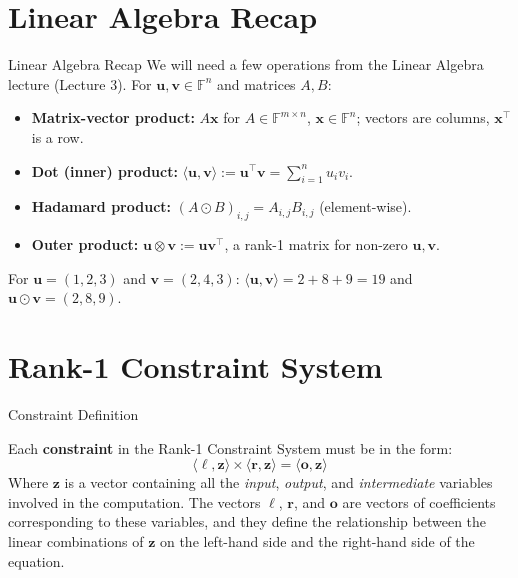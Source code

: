 \documentclass{zkdl-presentation-template}
\begin{document}
    \section{Linear Algebra Recap}

    \begin{frame}{Linear Algebra Recap}
        We will need a few operations from the Linear Algebra lecture (Lecture 3). For $\mathbf{u}, \mathbf{v} \in \mathbb{F}^n$ and matrices $A, B$:
        \begin{itemize}
            \item \textbf{Matrix-vector product:} $A\mathbf{x}$ for $A \in \mathbb{F}^{m \times n}$, $\mathbf{x} \in \mathbb{F}^n$; vectors are columns, $\mathbf{x}^{\top}$ is a row.\pause
            \item \textbf{Dot (inner) product:} $\langle \mathbf{u}, \mathbf{v} \rangle := \mathbf{u}^{\top}\mathbf{v} = \sum_{i=1}^{n} u_iv_i$.\pause
            \item \textbf{Hadamard product:} $(A \odot B)_{i,j} = A_{i,j}B_{i,j}$ (element-wise).\pause
            \item \textbf{Outer product:} $\mathbf{u} \otimes \mathbf{v} := \mathbf{u}\mathbf{v}^{\top}$, a rank-1 matrix for non-zero $\mathbf{u},\mathbf{v}$.
        \end{itemize}
        \pause

        \begin{example}
            For $\mathbf{u} = (1,2,3)$ and $\mathbf{v} = (2,4,3)$: $\langle \mathbf{u}, \mathbf{v} \rangle = 2 + 8 + 9 = 19$ and $\mathbf{u} \odot \mathbf{v} = (2, 8, 9)$.
        \end{example}
    \end{frame}

    \section{Rank-1 Constraint System}

    \begin{frame}{Constraint Definition}
        \begin{definition}
            Each \textbf{constraint} in the Rank-1 Constraint System must be in the form:
            \begin{equation*}
                \langle \boldsymbol{\ell}, \mathbf{z}\rangle \times \langle \boldsymbol{r}, \mathbf{z}\rangle = \langle \boldsymbol{o}, \mathbf{z}\rangle
            \end{equation*}
            Where $\mathbf{z}$ is a vector containing all the \textit{input}, \textit{output}, and 
            \textit{intermediate} variables involved in the computation. The vectors $\boldsymbol{\ell}$, 
            $\boldsymbol{r}$, and $\boldsymbol{o}$ are vectors of coefficients corresponding to these variables, 
            and they define the relationship between the linear combinations of $\mathbf{z}$ on the 
            left-hand side and the right-hand side of the equation.
        \end{definition}        
    \end{frame}
\end{document}
